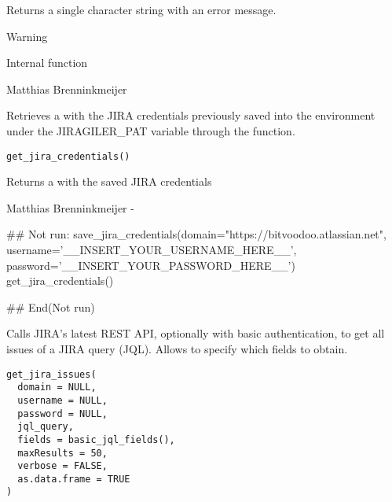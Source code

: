\documentclass[a4paper]{book}
\begin{document}
%
\begin{Value}
Returns a single character string with an error message.
\end{Value}
%
\begin{Section}{Warning}

Internal function
\end{Section}
%
\begin{Author}\relax
Matthias Brenninkmeijer 
\end{Author}
%
\begin{Description}\relax
Retrieves a  with the JIRA credentials previously saved into the environment under the JIRAGILER\_PAT variable through the  function.
\end{Description}
%
\begin{Usage}
\begin{verbatim}
get_jira_credentials()
\end{verbatim}
\end{Usage}
%
\begin{Value}
Returns a  with the saved JIRA credentials
\end{Value}
%
\begin{Author}\relax
Matthias Brenninkmeijer - 
\end{Author}
%
\begin{Examples}
\begin{ExampleCode}
## Not run: 
save_jira_credentials(domain="https://bitvoodoo.atlassian.net",
                      username='__INSERT_YOUR_USERNAME_HERE__',
                      password='__INSERT_YOUR_PASSWORD_HERE__')
get_jira_credentials()

## End(Not run)
\end{ExampleCode}
\end{Examples}
%
\begin{Description}\relax
Calls JIRA's latest REST API, optionally with basic authentication, to get all issues of a JIRA query (JQL). Allows to specify which fields to obtain.
\end{Description}
%
\begin{Usage}
\begin{verbatim}
get_jira_issues(
  domain = NULL,
  username = NULL,
  password = NULL,
  jql_query,
  fields = basic_jql_fields(),
  maxResults = 50,
  verbose = FALSE,
  as.data.frame = TRUE
)
\end{verbatim}
\end{Usage}
\end{document}
